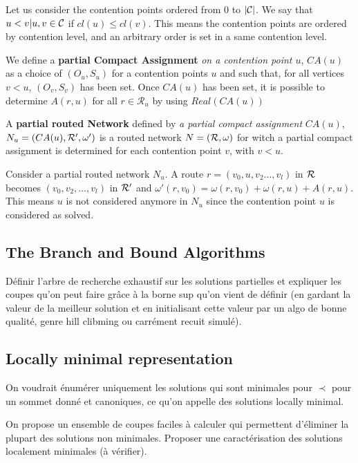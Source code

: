 Let us consider the contention points ordered from $0$ to $|{\cal C}|$. We say that $u < v | u,v\in{\cal C}$ if $cl(u) \leq cl(v)$. This means the contention points are ordered by contention level, and an arbitrary order is set in a same contention level.


We define a \textbf{partial Compact Assignment} \textit{on a contention point $u$}, $CA(u)$ as a choice of $(O_u,S_u)$ for a contention points $u$ and such that, for all vertices $v < u$, $(O_v,S_v)$ has been set.
Once $CA(u)$ has been set, it is possible to determine $A(r,u)$ for all $r \in \mathcal{R}_u$ by using $Real(CA(u))$


A \textbf{partial routed Network} defined by \textit{a partial compact assignment} $CA(u)$, $N_u = (CA(u),\cal{R}',\omega')$ is a routed network $N = (\cal{R},\omega)$ for witch a partial compact assignment is determined for each contention point $v$, with $v<u$.

Consider a partial routed network $N_u$.
A route $r = (v_0,u,v_2\ldots,v_l)$ in $\cal{R}$ becomes $(v_0,v_2,\ldots,v_l)$ in $\cal{R}'$ and $\omega'(r,v_0) = \omega(r,v_0)+\omega(r,u) + A(r,u)$. This means $u$ is not considered anymore in $N_u$ since the contention point $u$ is considered as solved.

\subsection{The Branch and Bound Algorithms}

Définir l'arbre de recherche exhaustif sur les solutions partielles et expliquer les coupes
qu'on peut faire grâce à la borne sup qu'on vient de définir (en gardant la valeur de la meilleur solution
et en initialisant cette valeur par un algo de bonne qualité, genre hill clibming ou carrément recuit simulé).


\subsection{Locally minimal representation}

On voudrait énumérer uniquement les solutions qui sont minimales pour 
$\prec$ pour un sommet donné et canoniques, ce qu'on appelle des solutions locally minimal.

On propose un ensemble de coupes faciles à calculer qui permettent d'éliminer la plupart des solutions 
non minimales. Proposer une caractérisation des solutions localement minimales (à vérifier).

